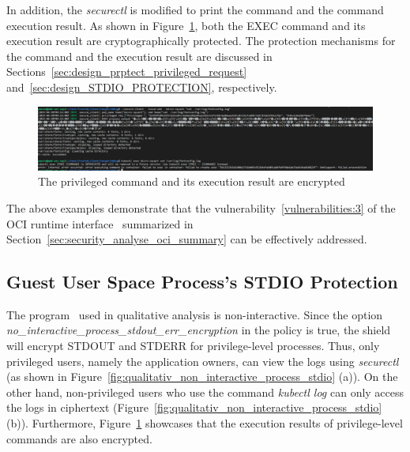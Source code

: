In addition, the \emph{securectl} is modified to print the command and the command execution result. As shown in Figure~\ref{fig:cquark_priviled_cmd_result_protection}, both the EXEC command and its execution result are cryptographically protected. The protection mechanisms for the command 
and the execution result are discussed in Sections~\ref{sec:design_prptect_privileged_request} and~\ref{sec:design_STDIO_PROTECTION}, respectively.
\begin{figure}[!htb]
  \centering
  \includegraphics[width=1\textwidth]{images/cquark_priviled_cmd_result_protection.PNG}
  \caption[The privileged command and its execution result are encrypted]{The privileged command and its execution result are encrypted}
  \label{fig:cquark_priviled_cmd_result_protection}
\end{figure}

The above examples demonstrate that the vulnerability~\ref{vulnerabilities:3} of the OCI runtime interface~\cite*{oci-runtime-spec} summarized in Section~\ref{sec:security_analyse_oci_summary} can be effectively addressed.



\subsection{Guest User Space Process's STDIO Protection}
\label{sec:eva_qualitativ_secure_stdio}
The program~\cite*{qualitativ_programs} used in qualitative analysis is non-interactive. Since the option \emph{no\_interactive\_process\_stdout\_err\_encryption} in the policy is true, the shield will encrypt STDOUT and STDERR for privilege-level processes. Thus, only privileged users, 
namely the application owners, can view the logs using \emph{securectl} (as shown in Figure~\ref{fig:qualitativ_non_interactive_process_stdio} (a)). On the other hand, non-privileged users who use the command \emph{kubectl log} can only access the logs in ciphertext (Figure~\ref{fig:qualitativ_non_interactive_process_stdio} (b)).
Furthermore, Figure~\ref{fig:cquark_priviled_cmd_result_protection} showcases that the execution results of privilege-level commands are also encrypted.

